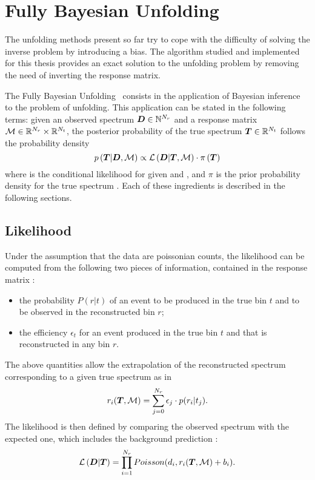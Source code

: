 \section{Fully Bayesian Unfolding}
\label{sec:fbu}
The unfolding methods present so far try to cope with the difficulty
of solving the inverse problem by introducing a bias. The algorithm
studied and implemented for this thesis provides an exact solution to
the unfolding problem by removing the need of inverting the response
matrix.

The Fully Bayesian Unfolding~\cite{fbu} consists in the application of
Bayesian inference to the problem of unfolding. This application can
be stated in the following terms: given an observed spectrum
$\boldsymbol{D}\in\mathbb{N}^{N_r}$ and a response matrix
$\mathcal{M}\in\mathbb{R}{}^{N_r}\times{}\mathbb{R}{}^{N_t}$, the posterior
probability of the true spectrum $\boldsymbol{T}{}\in{}\mathbb{R}{}^{N_t}$ follows
the probability density
\begin{equation}
p\left(\boldsymbol{T}{}|\boldsymbol{D}{},\mathcal{M}{}\right)
\propto{}
\mathcal{L}\left(\boldsymbol{D}{}|\boldsymbol{T}{},\mathcal{M}{}\right)
\cdot{}
\pi{}\left(\boldsymbol{T}{}\right)
\end{equation}
where \conditionalLhood{\Data{}}{\Truth{},\TrasfMatrix{}} is the
conditional likelihood for \Data{} given \Truth{} and \TrasfMatrix{},
and $\pi{}$ is the prior probability density for the true spectrum
\Truth{}.
Each of these ingredients is described in the following sections.

\subsection{Likelihood}
\label{sec:fbullhood}
Under the assumption that the data are poissonian counts, the
likelihood \conditionalLhood{\Data{}}{\Truth{},\TrasfMatrix{}} can be
computed from the following two pieces of information, contained in
the response matrix \TrasfMatrix{}:
\begin{itemize}
\item the probability $P(r|t)$ of an event to be
  produced in the true bin $t$ and to be observed in the reconstructed
  bin $r$;
\item the efficiency $\epsilon{}_t$ for an event produced in the
  true bin $t$ and that is reconstructed in any bin $r$.
\end{itemize}
The above quantities allow the extrapolation of the reconstructed spectrum
\Reco{} corresponding to a given true spectrum \Truth{} as in
\begin{equation}
r_i(\boldsymbol{T}{},\mathcal{M}{}) = \sum_{j=0}^{N_r}\epsilon_j\cdot{}p(r_i|t_j).
\end{equation}
The likelihood is then defined by comparing the observed spectrum
\Data{} with the expected one, which includes the background
prediction \Bckg{}:
\begin{equation}
\mathcal{L}\left(\boldsymbol{D}{}|\boldsymbol{T}{}\right) =
\prod_{i=1}^{N_r}Poisson(d_i,r_i(\boldsymbol{T}{},\mathcal{M}{})+b_i).
\end{equation}

